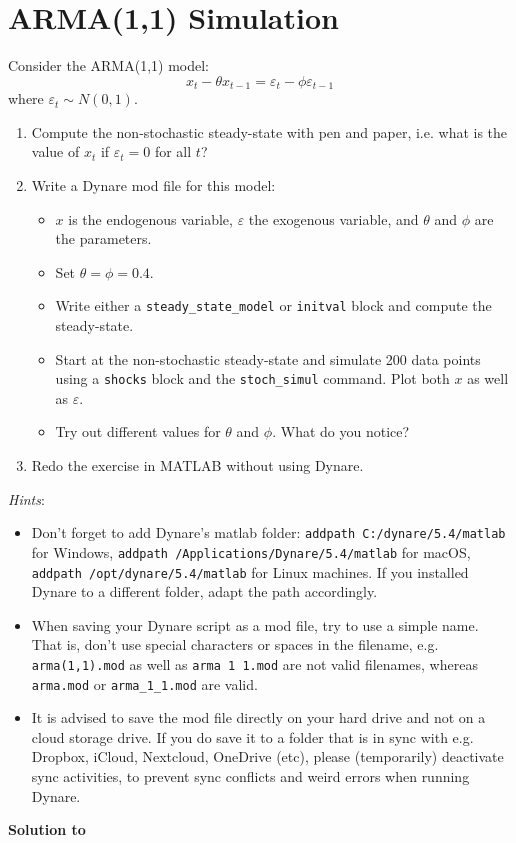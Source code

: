 \section[ARMA(1,1) Simulation]{ARMA(1,1) Simulation\label{ex:ARMASimulation}}
Consider the ARMA(1,1) model:
$$ x_t - \theta x_{t-1} = \varepsilon_t - \phi \varepsilon_{t-1}$$
where $\varepsilon_t \sim N(0,1)$.

\begin{enumerate}
\item Compute the non-stochastic steady-state with pen and paper, i.e. what is the value of $x_t$ if $\varepsilon_t = 0$ for all $t$?
\item Write a Dynare mod file for this model:
\begin{itemize}
	\item $x$ is the endogenous variable, $\varepsilon$ the exogenous variable, and $\theta$ and $\phi$ are the parameters.
	\item Set $\theta=\phi=0.4$.
	\item Write either a \texttt{steady\_state\_model} or \texttt{initval} block and compute the steady-state.
	\item Start at the non-stochastic steady-state and simulate 200 data points using a \texttt{shocks} block 
	and the \texttt{stoch\_simul} command. Plot both $x$ as well as $\varepsilon$.
	\item Try out different values for $\theta$ and $\phi$. What do you notice?
\end{itemize}
\item Redo the exercise in MATLAB without using Dynare.
\end{enumerate}
\emph{Hints}:
\begin{itemize}
	\item Don't forget to add Dynare's matlab folder:
	\texttt{addpath C:/dynare/5.4/matlab} for Windows,
	\texttt{addpath /Applications/Dynare/5.4/matlab} for macOS,
	\texttt{addpath /opt/dynare/5.4/matlab} for Linux machines.
	If you installed Dynare to a different folder, adapt the path accordingly.
	\item When saving your Dynare script as a mod file, try to use a simple name.
	That is, don't use special characters or spaces in the filename,
	  e.g. \texttt{arma(1,1).mod} as well as \texttt{arma 1 1.mod} are not valid filenames, 
	  whereas \texttt{arma.mod} or \texttt{arma\_1\_1.mod} are valid.
	\item It is advised to save the mod file directly on your hard drive and not on a cloud storage drive.
	If you do save it to a folder that is in sync with e.g. Dropbox, iCloud, Nextcloud, OneDrive (etc),
	  please (temporarily) deactivate sync activities,  
	  to prevent sync conflicts and weird errors when running Dynare.	
\end{itemize}


\begin{solution}\textbf{Solution to }
\ifDisplaySolutions

\fi
\newpage
\end{solution}